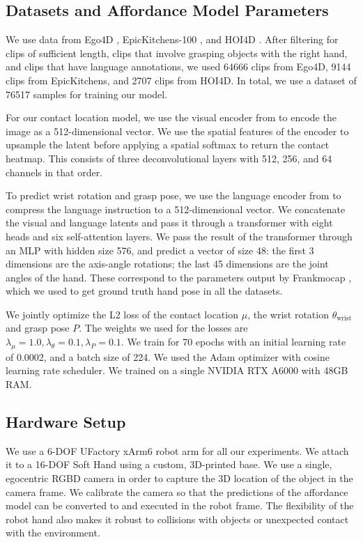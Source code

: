 \subsection{Datasets and Affordance Model Parameters}

We use data from Ego4D \cite{ego4d}, EpicKitchens-100 \cite{EPICKITCHENS}, and HOI4D \cite{hoi4d}.  After filtering for clips of sufficient length, clips that involve grasping objects with the right hand, and clips that have language annotations, we used 64666 clips from Ego4D, 9144 clips from EpicKitchens, and 2707 clips from HOI4D. In total, we use a dataset of 76517 samples for training our model.

For our contact location model, we use the visual encoder from \cite{r3m} to encode the image as a 512-dimensional vector. We use the spatial features of the encoder to upsample the latent before applying a spatial softmax to return the contact heatmap. This consists of three deconvolutional layers with 512, 256, and 64 channels in that order.

To predict wrist rotation and grasp pose, we use the language encoder from \cite{Clip} to compress the language instruction to a 512-dimensional vector. We concatenate the visual and language latents and pass it through a transformer with eight heads and six self-attention layers. We pass the result of the transformer through an MLP with hidden size 576, and predict a vector of size 48: the first 3 dimensions are the axis-angle rotations; the last 45 dimensions are the joint angles of the hand. These correspond to the parameters output by Frankmocap \cite{FrankMocap_2021_ICCV}, which we used to get ground truth hand pose in all the datasets.

We jointly optimize the L2 loss of the contact location $\mu$, the wrist rotation $\theta_\text{wrist}$ and grasp pose $P$. The weights we used for the losses are $\lambda_\mu = 1.0, \lambda_\theta = 0.1, \lambda_P = 0.1$. We train for 70 epochs with an initial learning rate of 0.0002, and a batch size of 224. We used the Adam optimizer \cite{kingma2014adam} with cosine learning rate scheduler. We trained on a single NVIDIA RTX A6000 with 48GB RAM.

\subsection{Hardware Setup}

We use a 6-DOF UFactory xArm6 robot arm for all our experiments. We attach it to a 16-DOF Soft Hand using a custom, 3D-printed base. We use a single, egocentric RGBD camera in order to capture the 3D location of the object in the camera frame. We calibrate the camera so that the predictions of the affordance model can be converted to and executed in the robot frame. The flexibility of the robot hand also makes it robust to collisions with objects or unexpected contact with the environment. 

